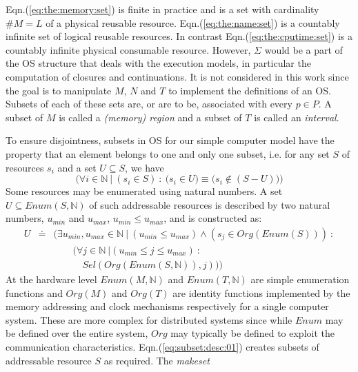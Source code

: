 \documentclass[draft]{article}
\def\names{\doteq}
\def\eqn#1{Eqn.(\ref{#1})}
\begin{document}
\eqn{eq:the:memory:set}  is  finite in  practice  and  is  a set  with
cardinality   $\#M   =   L$   of   a   physical   reusable   resource.
\eqn{eq:the:name:set} is a countably  infinite set of logical reusable
resources.   In  contrast   \eqn{eq:the:cputime:set}  is  a  countably
infinite physical  consumable resource.  However, $\Sigma$  would be a
part  of the OS  structure that  deals with  the execution  models, in
particular the  computation of closures and continuations.   It is not
considered in this  work since the goal is to  manipulate $M$, $N$ and
$T$ to implement  the definitions of an OS.  Subsets  of each of these
sets are, or are to be, associated  with every $p \in P$.  A subset of
$M$ is called  a \emph{(memory) region} and a subset  of $T$ is called
an \emph{interval}.

To ensure  disjointness, subsets in  OS for our simple  computer model
have the property that an element  belongs to one and only one subset,
i.e.  for any set $S$ of resources $s_i$ and a set $U \subseteq S$, we
have
\begin{equation}
  \label{eq:subset:prop:01}
  \biggl(\forall i \in \mathbb{N}\ \vert\ (s_i \in S)\ :\ \bigl(s_i
  \in U\bigr) \equiv \bigl(s_i \not \in (S - U)\bigr) \biggr)
\end{equation}
Some  resources may  be enumerated  using natural  numbers.  A  set $U
\subseteq  Enum(S,  \mathbb{N})$  of  such  addressable  resources  is
described by  two natural  numbers, $u_{min}$ and  $u_{max}$, $u_{min}
\le u_{max}$, and is constructed as:
\begin{eqnarray}
  \label{eq:subset:desc:01}
  U &\names& (\exists u_{min}, u_{max} \in \mathbb{N}\
  \vert\ (u_{min} \le  u_{max}) \wedge (s_j \in Org(Enum(S)))\ :
  \nonumber 
  \\ &~& \quad\quad
  (\forall j \in \mathbb{N}\ \vert (u_{min} \le j \le u_{max})\ :
  \nonumber \\ 
  &~& \quad\quad\quad
  Sel(Org(Enum(S,\mathbb{N})), j) ))
\end{eqnarray}
At  the hardware  level $Enum(M,\mathbb{N})$  and $Enum(T,\mathbb{N})$
are  simple  enumeration  functions  and  $Org(M)$  and  $Org(T)$  are
identity  functions implemented  by  the memory  addressing and  clock
mechanisms respectively for a  single computer system.  These are more
complex for distributed systems since while $Enum$ may be defined over
the  entire system,  $Org$ may  typically  be defined  to exploit  the
communication    characteristics.    \eqn{eq:subset:desc:01}   creates
subsets of  addressable resource $S$ as  required.  The \emph{makeset}
\end{document}
